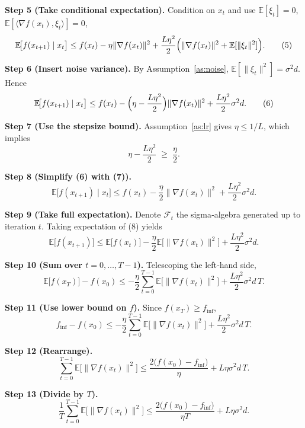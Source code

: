 \documentclass[11pt]{article}
\newcommand{\E}{\mathbb{E}}
\begin{document}
\noindent\textbf{Step 5 (Take conditional expectation).}  
Condition on $x_t$ and use $\E[\xi_t]=0$, $\E[\langle \nabla f(x_t),\xi_t\rangle]=0$,
\[
\E\!\bigl[f(x_{t+1})\mid x_t\bigr]
\le f(x_t)-\eta\|\nabla f(x_t)\|^{2}
+\frac{L\eta^{2}}{2}\Bigl(\|\nabla f(x_t)\|^{2}+\E[\|\xi_t\|^{2}]\Bigr). \tag{5}
\]

\noindent\textbf{Step 6 (Insert noise variance).}  
By Assumption~\ref{as:noise}, $\E[\|\xi_t\|^{2}]=\sigma^{2}d$. Hence
\[
\E\!\bigl[f(x_{t+1})\mid x_t\bigr]
\le f(x_t)-\Bigl(\eta-\frac{L\eta^{2}}{2}\Bigr)\|\nabla f(x_t)\|^{2}
+\frac{L\eta^{2}}{2}\sigma^{2}d .                                   \tag{6}
\]

\noindent\textbf{Step 7 (Use the stepsize bound).}  
Assumption~\ref{as:lr} gives $\eta\le 1/L$, which implies
\[
\eta-\frac{L\eta^{2}}{2}\;\ge\;\frac{\eta}{2}.                     \tag{7}
\]

\noindent\textbf{Step 8 (Simplify (6) with (7)).}  
\[
\E\!\bigl[f(x_{t+1})\mid x_t\bigr]
\le f(x_t)-\frac{\eta}{2}\|\nabla f(x_t)\|^{2}
+\frac{L\eta^{2}}{2}\sigma^{2}d .                                   \tag{8}
\]

\noindent\textbf{Step 9 (Take full expectation).}  
Denote $\mathcal{F}_t$ the sigma‑algebra generated up to iteration $t$.
Taking expectation of (8) yields
\[
\E\!\bigl[f(x_{t+1})\bigr]
\le \E\!\bigl[f(x_t)\bigr]-\frac{\eta}{2}\E\!\bigl[\|\nabla f(x_t)\|^{2}\bigr]
+\frac{L\eta^{2}}{2}\sigma^{2}d .                                   \tag{9}
\]

\noindent\textbf{Step 10 (Sum over $t=0,\dots,T-1$).}  
Telescoping the left‑hand side,
\[
\E\!\bigl[f(x_T)\bigr]-f(x_0)
\le -\frac{\eta}{2}\sum_{t=0}^{T-1}\E\!\bigl[\|\nabla f(x_t)\|^{2}\bigr]
+ \frac{L\eta^{2}}{2}\sigma^{2}d\,T .                               \tag{10}
\]

\noindent\textbf{Step 11 (Use lower bound on $f$).}  
Since $f(x_T)\ge f_{\inf}$,
\[
f_{\inf}-f(x_0)
\le -\frac{\eta}{2}\sum_{t=0}^{T-1}\E\!\bigl[\|\nabla f(x_t)\|^{2}\bigr]
+ \frac{L\eta^{2}}{2}\sigma^{2}d\,T .                               \tag{11}
\]

\noindent\textbf{Step 12 (Rearrange).}  
\[
\sum_{t=0}^{T-1}\E\!\bigl[\|\nabla f(x_t)\|^{2}\bigr]
\le \frac{2\bigl(f(x_0)-f_{\inf}\bigr)}{\eta}
+ L\eta\sigma^{2}d\,T .                                            \tag{12}
\]

\noindent\textbf{Step 13 (Divide by $T$).}  
\[
\frac{1}{T}\sum_{t=0}^{T-1}\E\!\bigl[\|\nabla f(x_t)\|^{2}\bigr]
\le \frac{2\bigl(f(x_0)-f_{\inf}\bigr)}{\eta T}
+ L\eta\sigma^{2}d .                                                \tag{13}
\]
\end{document}
